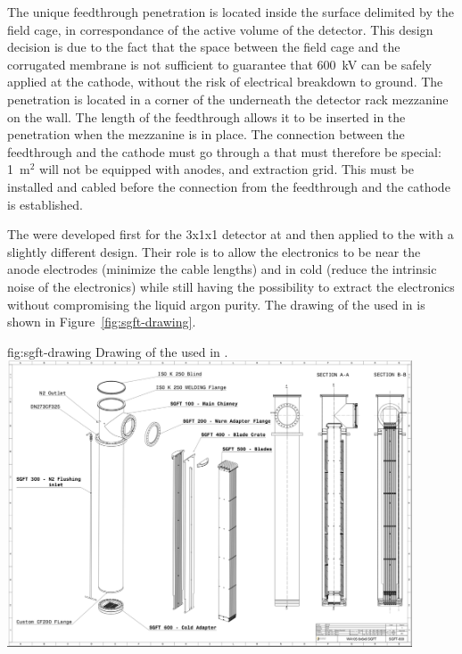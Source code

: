 The unique  feedthrough penetration is located inside the surface delimited by the field cage, in correspondance of the active volume of the detector.
This design decision is due to the fact that the space between the field cage and the corrugated membrane is not sufficient to guarantee that 600~kV can be safely applied at the cathode, without the risk of electrical breakdown to ground.
The penetration is located in a corner of the  underneath the detector rack mezzanine on the  wall.
The length of the feedthrough allows it to be inserted in the penetration when the mezzanine is in place.
The connection between the feedthrough and the cathode must go through a  that must therefore be special: 1~m$^2$ will not be equipped with anodes,  and extraction grid.
This  must be installed and cabled before the connection from the  feedthrough and the cathode is established.

The  were developed first for the 3x1x1 detector at  and then applied to the  with a slightly different design.
Their role is to allow the electronics to be near the anode electrodes (minimize the cable lengths) and in cold (reduce the intrinsic noise of the electronics) while still having the possibility to extract the electronics without compromising the liquid argon purity.
The drawing of the  used in  is shown in Figure~\ref{fig:sgft-drawing}.
\begin{dunefigure}{fig:sgft-drawing}
{Drawing of the  used in .}
\includegraphics[width=0.9\textwidth]{graphics/sgft-drawing.png}
\end{dunefigure}

